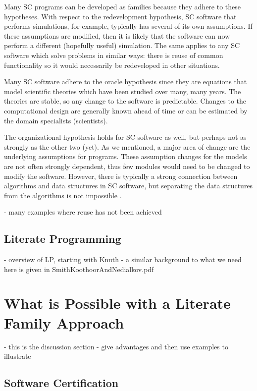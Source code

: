 \documentclass[10pt, preprint]{sigplanconf}
\begin{document}
Many SC programs can be developed as families because they adhere to these hypotheses. With respect to the redevelopment hypothesis, SC software that performs simulations, for example, typically has several of its own assumptions. If these assumptions are modified, then it is likely that the software can now perform a different (hopefully useful) simulation. The same applies to any SC software which solve problems in similar ways: there is reuse of common functionality so it would necessarily be redeveloped in other situations. 

Many SC software adhere to the oracle hypothesis since they are equations that model scientific theories which have been studied over many, many years. The theories are stable, so any change to the software is predictable. Changes to the computational design are generally known ahead of time or can be estimated by the domain specialists (scientists).

The organizational hypothesis holds for SC software as well, but perhaps not as strongly as the other two (yet). As we mentioned, a major area of change are the underlying assumptions for programs. These assumption changes for the models are not often strongly dependent, thus few modules would need to be changed to modify the software. However, there is typically a strong connection between algorithms and data structures in SC software, but separating the data structures from the algorithms is not impossible \cite{Berti2000, ElSheikh2004}. 

- many examples where reuse has not been achieved

\subsection{Literate Programming}
\label{subsec:literate}

- overview of LP, starting with Knuth - a similar background to what we need here is given in SmithKoothoorAndNedialkov.pdf

\section{What is Possible with a Literate Family Approach}
\label{sec:what}

- this is the discussion section - give advantages and then use examples to illustrate

\subsection{Software Certification}
\label{subsec:software}
\end{document}
